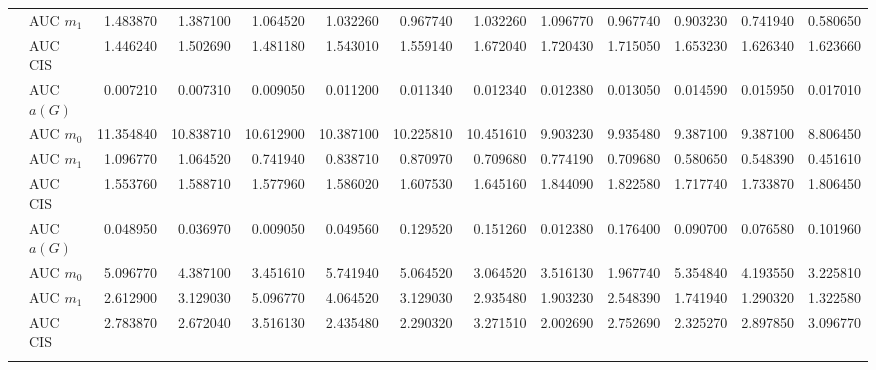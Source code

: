 \begin{table}[htbp]
\begin{tabular}{llrrrrrrrrrrr}
    & AUC $m_1$ & 1.483870 & 1.387100 & 1.064520 & 1.032260 & 0.967740 & 1.032260 & 1.096770 & 0.967740 & 0.903230 & 0.741940 & 0.580650 \\
    & AUC CIS & 1.446240 & 1.502690 & 1.481180 & 1.543010 & 1.559140 & 1.672040 & 1.720430 & 1.715050 & 1.653230 & 1.626340 & 1.623660 \\
    \addlinespace
    \multirow{4}{*}{degree} & AUC $a(G)$ & 0.007210 & 0.007310 & 0.009050 & 0.011200 & 0.011340 & 0.012340 & 0.012380 & 0.013050 & 0.014590 & 0.015950 & 0.017010 \\
    & AUC $m_0$ & 11.354840 & 10.838710 & 10.612900 & 10.387100 & 10.225810 & 10.451610 & 9.903230 & 9.935480 & 9.387100 & 9.387100 & 8.806450 \\
    & AUC $m_1$ & 1.096770 & 1.064520 & 0.741940 & 0.838710 & 0.870970 & 0.709680 & 0.774190 & 0.709680 & 0.580650 & 0.548390 & 0.451610 \\
    & AUC CIS & 1.553760 & 1.588710 & 1.577960 & 1.586020 & 1.607530 & 1.645160 & 1.844090 & 1.822580 & 1.717740 & 1.733870 & 1.806450 \\
    \addlinespace
    \multirow{4}{*}{random} & AUC $a(G)$ & 0.048950 & 0.036970 & 0.009050 & 0.049560 & 0.129520 & 0.151260 & 0.012380 & 0.176400 & 0.090700 & 0.076580 & 0.101960 \\
    & AUC $m_0$ & 5.096770 & 4.387100 & 3.451610 & 5.741940 & 5.064520 & 3.064520 & 3.516130 & 1.967740 & 5.354840 & 4.193550 & 3.225810 \\
    & AUC $m_1$ & 2.612900 & 3.129030 & 5.096770 & 4.064520 & 3.129030 & 2.935480 & 1.903230 & 2.548390 & 1.741940 & 1.290320 & 1.322580 \\
    & AUC CIS & 2.783870 & 2.672040 & 3.516130 & 2.435480 & 2.290320 & 3.271510 & 2.002690 & 2.752690 & 2.325270 & 2.897850 & 3.096770 \\
    \addlinespace
    \bottomrule
  \end{tabular}
\end{table}

